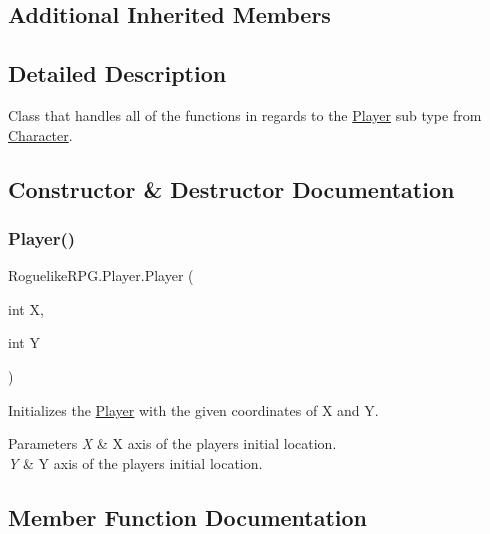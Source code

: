 \subsection*{Additional Inherited Members}


\subsection{Detailed Description}
Class that handles all of the functions in regards to the \mbox{\hyperlink{class_roguelike_r_p_g_1_1_player}{Player}} sub type from \mbox{\hyperlink{class_roguelike_r_p_g_1_1_character}{Character}}. 



\subsection{Constructor \& Destructor Documentation}
\mbox{\label{class_roguelike_r_p_g_1_1_player_a998f3a9a1b1849f460689ec87ce14b72}} 
\subsubsection{\texorpdfstring{Player()}{Player()}}
{\footnotesize\ttfamily Roguelike\+R\+P\+G.\+Player.\+Player (\begin{DoxyParamCaption}\item[{int}]{X,  }\item[{int}]{Y }\end{DoxyParamCaption})\hspace{0.3cm}{\ttfamily [inline]}}



Initializes the \mbox{\hyperlink{class_roguelike_r_p_g_1_1_player}{Player}} with the given coordinates of X and Y. 


\begin{DoxyParams}{Parameters}
{\em X} & X axis of the player\textquotesingle{}s initial location.\\
\hline
{\em Y} & Y axis of the player\textquotesingle{}s initial location.\\
\hline
\end{DoxyParams}


\subsection{Member Function Documentation}
\mbox{\label{class_roguelike_r_p_g_1_1_player_ac0ed6040b097a55a18e19ee9e604f5de}} 
